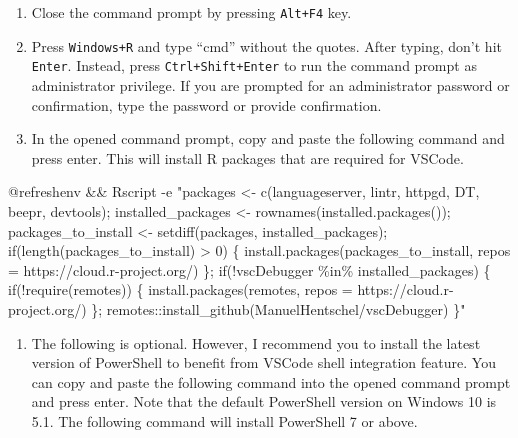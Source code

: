 \documentclass[
  letterpaper,
  DIV=11,
  numbers=noendperiod]{scrartcl}
\newenvironment{Shaded}{\begin{snugshade}}{\end{snugshade}}
\newcommand{\NormalTok}[1]{\textcolor[rgb]{0.00,0.23,0.31}{#1}}
\newcommand{\SpecialCharTok}[1]{\textcolor[rgb]{0.37,0.37,0.37}{#1}}
\newcommand{\StringTok}[1]{\textcolor[rgb]{0.13,0.47,0.30}{#1}}
\providecommand{\tightlist}{%
  \setlength{\itemsep}{0pt}\setlength{\parskip}{0pt}}\usepackage{longtable,booktabs,array}
\begin{document}
\begin{enumerate}
\def\labelenumi{\arabic{enumi}.}
\setcounter{enumi}{4}
\item
  Close the command prompt by pressing \texttt{Alt+F4} key.
\item
  Press \texttt{Windows+R} and type ``cmd'' without the quotes. After
  typing, don't hit \texttt{Enter}. Instead, press
  \texttt{Ctrl+Shift+Enter} to run the command prompt as administrator
  privilege. If you are prompted for an administrator password or
  confirmation, type the password or provide confirmation.
\item
  In the opened command prompt, copy and paste the following command and
  press enter. This will install R packages that are required for
  VSCode.
\end{enumerate}

\begin{Shaded}
\begin{Highlighting}[]
\SpecialCharTok{@}\NormalTok{refreshenv }\SpecialCharTok{\&\&}\NormalTok{ Rscript }\SpecialCharTok{{-}}\NormalTok{e }\StringTok{"packages \textless{}{-} c(\textquotesingle{}languageserver\textquotesingle{}, \textquotesingle{}lintr\textquotesingle{}, \textquotesingle{}httpgd\textquotesingle{}, \textquotesingle{}DT\textquotesingle{}, \textquotesingle{}beepr\textquotesingle{}, \textquotesingle{}devtools\textquotesingle{}); installed\_packages \textless{}{-} rownames(installed.packages()); packages\_to\_install \textless{}{-} setdiff(packages, installed\_packages); if(length(packages\_to\_install) \textgreater{} 0) \{ install.packages(packages\_to\_install, repos = \textquotesingle{}https://cloud.r{-}project.org/\textquotesingle{}) \}; if(!\textquotesingle{}vscDebugger\textquotesingle{} \%in\% installed\_packages) \{ if(!require(remotes)) \{ install.packages(\textquotesingle{}remotes\textquotesingle{}, repos = \textquotesingle{}https://cloud.r{-}project.org/\textquotesingle{}) \}; remotes::install\_github(\textquotesingle{}ManuelHentschel/vscDebugger\textquotesingle{}) \}"}
\end{Highlighting}
\end{Shaded}

\begin{enumerate}
\def\labelenumi{\arabic{enumi}.}
\setcounter{enumi}{7}
\tightlist
\item
  The following is optional. However, I recommend you to install the
  latest version of PowerShell to benefit from VSCode shell integration
  feature. You can copy and paste the following command into the opened
  command prompt and press enter. Note that the default PowerShell
  version on Windows 10 is 5.1. The following command will install
  PowerShell 7 or above.
\end{enumerate}
\end{document}
